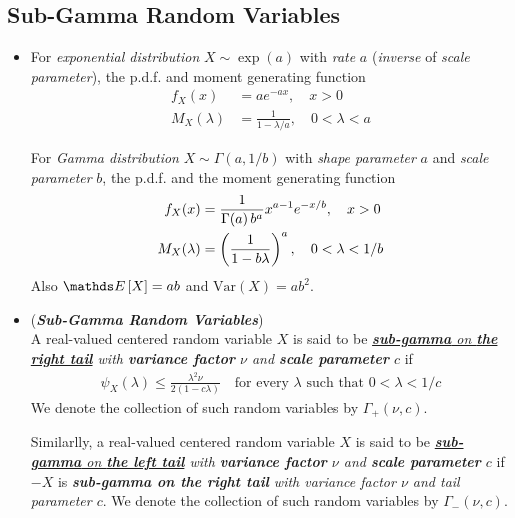 \documentclass[11pt]{article}
\begin{document}
\subsection{Sub-Gamma Random Variables}
\begin{itemize}
\item \begin{remark}
For \emph{exponential distribution} $X \sim \exp(a)$ with \emph{rate} $a$ (\emph{inverse} of \emph{scale parameter}), the p.d.f. and moment generating function
\begin{align*}
f_{X}(x) &= a e^{-ax},\quad  x > 0\\
M_{X}(\lambda) &= \frac{1}{1  - \lambda/a},\quad  0 < \lambda < a
\end{align*}

For \emph{Gamma distribution} $X \sim \Gamma(a, 1/b)$ with \emph{shape parameter} $a$ and \emph{scale parameter} $b$, the p.d.f. and the moment generating function
\begin{align*}
f_{X}(x) &= \frac{1}{\Gamma(a)\,b^a} x^{a-1} e^{-x/b},\quad  x > 0\\
M_{X}(\lambda) &= \left(\frac{1}{1  - b \lambda }\right)^{a},\quad  0 < \lambda < 1/b
\end{align*}Also $\E{}{X} = ab$ and $\text{Var}(X) = ab^2$.
\end{remark}



\item \begin{definition}(\emph{\textbf{Sub-Gamma Random Variables}})\\
A real-valued centered random variable $X$ is said to be \emph{\underline{\textbf{sub-gamma} on \textbf{the right tail}} with \textbf{variance factor} $\nu$ and \textbf{scale parameter} $c$} if
\begin{align*}
\psi_X(\lambda) \le \frac{\lambda^2 \nu}{2(1 - c\lambda)} \quad \text{for every $\lambda$ such that $0 < \lambda < 1/c$} 
\end{align*} We denote the collection of such random variables by $\Gamma_{+}(\nu, c)$.

Similarlly, a real-valued centered random variable $X$ is said to be \emph{\underline{\textbf{sub-gamma} on \textbf{the left tail}} with \textbf{variance factor} $\nu$ and \textbf{scale parameter} $c$} if $-X$ is \emph{\textbf{sub-gamma on the right tail} with variance factor $\nu$ and tail parameter $c$}. We denote the collection of such random variables by $\Gamma_{-}(\nu, c)$. 


\end{definition}
\end{itemize}
\end{document}
